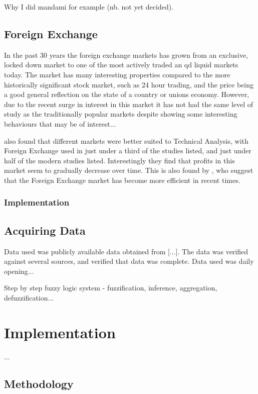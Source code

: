 \documentclass{article}
\theoremstyle{definition}
\begin{document}
Why I did mandami for example (nb. not yet decided).

\subsection{Foreign Exchange}

In the past 30 years the foreign exchange markets has grown from an exclusive, locked down market to one of the most actively traded an qd liquid markets today. The market has many interesting properties compared to the more historically significant stock market, such as 24 hour trading, and the price being a good general reflection on the state of a country or unions economy. However, due to the recent surge in interest in this market it has not had the same level of study as the traditionally popular markets despite showing some interesting behaviours that may be of interest...

\cite{taprofitability} also found that different markets were better suited to Technical Analysis, with Foreign Exchange used in just under a third of the studies listed, and just under half of the modern studies listed. Interestingly they find that profits in this market seem to gradually decrease over time. This is also found by \cite{ttrp2006}, who suggest that the Foreign Exchange market has become more efficient in recent times.

\subsubsection{Implementation}

\subsection{Acquiring Data}

Data used was publicly available data obtained from [...]. The data was verified against several sources, and verified that data was complete. Data used was daily opening...

Step by step fuzzy logic system - fuzzification, inference, aggregation, defuzzification...

\section{Implementation}

...

\subsection{Methodology}
\end{document}
